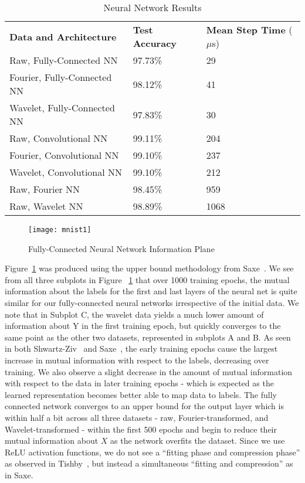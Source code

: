 \begin{table}[h!]
\centering	
\begin{tabular}{l|ll}
\textbf{Data and Architecture}  & \textbf{Test Accuracy} & \textbf{Mean Step Time} ($\mu$s) \\\cline{1-3}
Raw, Fully-Connected NN            & 97.73\%         & 29\\
Fourier, Fully-Connected NN        & 98.12\%         & 41\\
Wavelet, Fully-Connected NN        & 97.83\%         & 30\\
\hline
Raw, Convolutional NN              & 99.11\%         & 204\\ 
Fourier, Convolutional NN          & 99.10\%         & 237\\
Wavelet, Convolutional NN          & 99.10\%         & 212\\
\hline
Raw, Fourier NN                    & 98.45\%         & 959\\
Raw, Wavelet NN                    & 98.89\%         & 1068\\ 
\end{tabular}
\caption{Neural Network Results}
\label{Tab:test}
\end{table}

\begin{figure}[h]
\begin{center}
\texttt{[image: mnist1]}
\caption{Fully-Connected Neural Network Information Plane}
\label{fig:mnist fc infoplane}
\centering
\end{center}
\end{figure}
Figure~\ref{fig:mnist fc infoplane} was produced using the upper bound methodology from Saxe~\cite{saxe2019information}. 
We see from all three subplots in Figure ~\ref{fig:mnist fc infoplane} that over 1000 training epochs, the mutual information about the labels for the first and last layers of the neural net is quite similar for our fully-connected neural networks irrespective of the initial data.
We note that in Subplot C, the wavelet data yields a much lower amount of information about Y in the first training epoch, but quickly converges to the same point as the other two datasets, represented in subplots A and B.
As seen in both Shwartz-Ziv~\cite{shwartz2017opening} and Saxe~\cite{saxe2019information}, the early training epochs cause the largest increase in mutual information with respect to the labels, decreasing over training. 
We also observe a slight decrease in the amount of mutual information with respect to the data in later training epochs - which is expected as the learned representation becomes better able to map data to labels. 
The fully connected network converges to an upper bound for the output layer which is within half a bit across all three datasets - raw, Fourier-transformed, and Wavelet-transformed - within the first 500 epochs and begin to reduce their mutual information about $X$ as the network overfits the dataset.
Since we use ReLU activation functions, we do not see a ``fitting phase and compression phase'' as observed in Tishby~\cite{tishby2015deep}, but instead a simultaneous ``fitting and compression'' as in Saxe.

